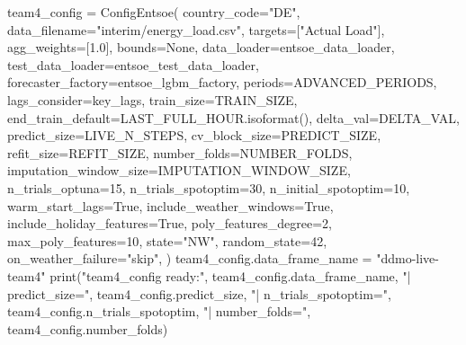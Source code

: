 \documentclass[
  english,
  letterpaper,
]{scrbook}
\newenvironment{Shaded}{\begin{snugshade}}{\end{snugshade}}
\newcommand{\BuiltInTok}[1]{\textcolor[rgb]{0.00,0.23,0.31}{#1}}
\newcommand{\DecValTok}[1]{\textcolor[rgb]{0.68,0.00,0.00}{#1}}
\newcommand{\FloatTok}[1]{\textcolor[rgb]{0.68,0.00,0.00}{#1}}
\newcommand{\NormalTok}[1]{\textcolor[rgb]{0.00,0.23,0.31}{#1}}
\newcommand{\OperatorTok}[1]{\textcolor[rgb]{0.37,0.37,0.37}{#1}}
\newcommand{\StringTok}[1]{\textcolor[rgb]{0.13,0.47,0.30}{#1}}
\newcommand{\VariableTok}[1]{\textcolor[rgb]{0.07,0.07,0.07}{#1}}
\begin{document}
\begin{Shaded}
\begin{Highlighting}[]
\NormalTok{team4\_config }\OperatorTok{=}\NormalTok{ ConfigEntsoe(}
\NormalTok{    country\_code}\OperatorTok{=}\StringTok{"DE"}\NormalTok{,}
\NormalTok{    data\_filename}\OperatorTok{=}\StringTok{"interim/energy\_load.csv"}\NormalTok{,}
\NormalTok{    targets}\OperatorTok{=}\NormalTok{[}\StringTok{"Actual Load"}\NormalTok{],}
\NormalTok{    agg\_weights}\OperatorTok{=}\NormalTok{[}\FloatTok{1.0}\NormalTok{],}
\NormalTok{    bounds}\OperatorTok{=}\VariableTok{None}\NormalTok{,}
\NormalTok{    data\_loader}\OperatorTok{=}\NormalTok{entsoe\_data\_loader,}
\NormalTok{    test\_data\_loader}\OperatorTok{=}\NormalTok{entsoe\_test\_data\_loader,}
\NormalTok{    forecaster\_factory}\OperatorTok{=}\NormalTok{entsoe\_lgbm\_factory,}
\NormalTok{    periods}\OperatorTok{=}\NormalTok{ADVANCED\_PERIODS,}
\NormalTok{    lags\_consider}\OperatorTok{=}\NormalTok{key\_lags,}
\NormalTok{    train\_size}\OperatorTok{=}\NormalTok{TRAIN\_SIZE,}
\NormalTok{    end\_train\_default}\OperatorTok{=}\NormalTok{LAST\_FULL\_HOUR.isoformat(),}
\NormalTok{    delta\_val}\OperatorTok{=}\NormalTok{DELTA\_VAL,}
\NormalTok{    predict\_size}\OperatorTok{=}\NormalTok{LIVE\_N\_STEPS,}
\NormalTok{    cv\_block\_size}\OperatorTok{=}\NormalTok{PREDICT\_SIZE,}
\NormalTok{    refit\_size}\OperatorTok{=}\NormalTok{REFIT\_SIZE,}
\NormalTok{    number\_folds}\OperatorTok{=}\NormalTok{NUMBER\_FOLDS,}
\NormalTok{    imputation\_window\_size}\OperatorTok{=}\NormalTok{IMPUTATION\_WINDOW\_SIZE,}
\NormalTok{    n\_trials\_optuna}\OperatorTok{=}\DecValTok{15}\NormalTok{,}
\NormalTok{    n\_trials\_spotoptim}\OperatorTok{=}\DecValTok{30}\NormalTok{,}
\NormalTok{    n\_initial\_spotoptim}\OperatorTok{=}\DecValTok{10}\NormalTok{,}
\NormalTok{    warm\_start\_lags}\OperatorTok{=}\VariableTok{True}\NormalTok{,}
\NormalTok{    include\_weather\_windows}\OperatorTok{=}\VariableTok{True}\NormalTok{,}
\NormalTok{    include\_holiday\_features}\OperatorTok{=}\VariableTok{True}\NormalTok{,}
\NormalTok{    poly\_features\_degree}\OperatorTok{=}\DecValTok{2}\NormalTok{,}
\NormalTok{    max\_poly\_features}\OperatorTok{=}\DecValTok{10}\NormalTok{,}
\NormalTok{    state}\OperatorTok{=}\StringTok{"NW"}\NormalTok{,}
\NormalTok{    random\_state}\OperatorTok{=}\DecValTok{42}\NormalTok{,}
\NormalTok{    on\_weather\_failure}\OperatorTok{=}\StringTok{"skip"}\NormalTok{,}
\NormalTok{)}
\NormalTok{team4\_config.data\_frame\_name }\OperatorTok{=} \StringTok{"ddmo{-}live{-}team4"}
\BuiltInTok{print}\NormalTok{(}\StringTok{"team4\_config ready:"}\NormalTok{, team4\_config.data\_frame\_name,}
      \StringTok{"| predict\_size="}\NormalTok{, team4\_config.predict\_size,}
      \StringTok{"| n\_trials\_spotoptim="}\NormalTok{, team4\_config.n\_trials\_spotoptim,}
      \StringTok{"| number\_folds="}\NormalTok{, team4\_config.number\_folds)}
\end{Highlighting}
\end{Shaded}
\end{document}
